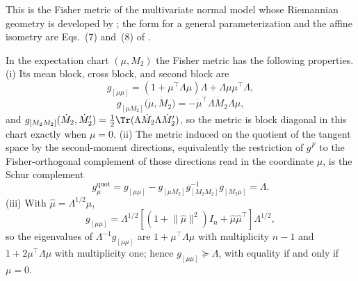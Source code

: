 \medskip
This is the Fisher metric of the multivariate normal model whose Riemannian
geometry is developed by \citet{Skovgaard1984}; the form for a general
parameterization and the affine isometry are Eqs.~(7) and~(8) of
\citet{PineleStrapassonCosta2020}.

In the expectation chart \((\mu,M_2)\) the Fisher metric has the following
properties.
(i) Its mean block, cross block, and second block are
\begin{equation}
g_{[\mu\mu]}=\left(1+\mu^\top\Lambda\mu\right)\Lambda+\Lambda\mu\mu^\top\Lambda,
\label{eq:ig-meanblock}
\end{equation}
\begin{equation}
g_{[\mu M_2]}\bigl(\dot\mu,\dot M_2\bigr)=-\dot\mu^\top\Lambda\dot M_2\Lambda\mu,
\label{eq:ig-crossblock}
\end{equation}
and \(g_{[M_2M_2]}(\dot M_2,\dot M_2')=\tfrac12\Tr(\Lambda\dot M_2\Lambda\dot M_2')\),
so the metric is block diagonal in this chart exactly when \(\mu=0\).
(ii)\label{cor:ig-expectation-mean-quotient} The metric induced on the quotient
of the tangent space by the second-moment directions, equivalently the
restriction of \(g^F\) to the Fisher-orthogonal complement of those directions
read in the coordinate \(\mu\), is the Schur complement
\begin{equation}
g_{\mu}^{\mathrm{quot}}
=g_{[\mu\mu]}-g_{[\mu M_2]}g_{[M_2M_2]}^{-1}g_{[M_2\mu]}
=\Lambda.
\label{eq:ig-expectation-mean-quotient}
\end{equation}
(iii)\label{cor:ig-mean-block-discrepancy} With \(\hat\mu=\Lambda^{1/2}\mu\),
\begin{equation}
g_{[\mu\mu]}=\Lambda^{1/2}\left[\left(1+\lVert\hat\mu\rVert^2\right)I_n+\hat\mu\hat\mu^\top\right]\Lambda^{1/2},
\label{eq:ig-meanblock-factored}
\end{equation}
so the eigenvalues of \(\Lambda^{-1}g_{[\mu\mu]}\) are \(1+\mu^\top\Lambda\mu\)
with multiplicity \(n-1\) and \(1+2\mu^\top\Lambda\mu\) with multiplicity one;
hence \(g_{[\mu\mu]}\succeq\Lambda\), with equality if and only if \(\mu=0\).

